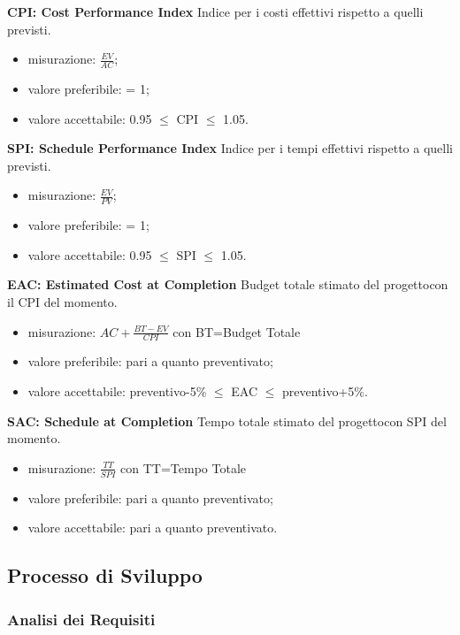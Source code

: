 				\textbf{CPI: Cost Performance Index} Indice per i costi effettivi rispetto a quelli previsti.
				\begin{itemize}
					\item misurazione: $\frac{EV}{AC}$;
					\item valore preferibile: = 1;
					\item valore accettabile: 0.95 $\le$ CPI $\le$ 1.05.
				\end{itemize}
				\textbf{SPI: Schedule Performance Index} Indice per i tempi effettivi rispetto a quelli previsti.
				\begin{itemize}
					\item misurazione: $\frac{EV}{PV}$;
					\item valore preferibile: = 1;
					\item valore accettabile: 0.95 $\le$ SPI $\le$ 1.05.
				\end{itemize}
				\textbf{EAC: Estimated Cost at Completion} Budget totale stimato del progetto\glosp con il CPI del momento.
				\begin{itemize}
					\item misurazione: $AC+ \frac{BT-EV}{CPI}$ con BT=Budget Totale
					\item valore preferibile: pari a quanto preventivato;
					\item valore accettabile: preventivo-5\% $\le$ EAC $\le$ preventivo+5\%.
				\end{itemize}
				\textbf{SAC: Schedule at Completion} Tempo totale stimato del progetto\glosp con SPI del momento.
				\begin{itemize}
					\item misurazione: $\frac{TT}{SPI}$ con TT=Tempo Totale
					\item valore preferibile: pari a quanto preventivato;
					\item valore accettabile: pari a quanto preventivato.
				\end{itemize}
				
											
	\subsection{Processo di Sviluppo}
		\subsubsection{Analisi dei Requisiti} 

